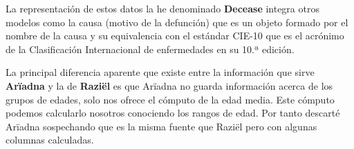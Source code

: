 La representación de estos datos la he denominado \textbf{Decease} integra otros modelos como
la causa (motivo de la defunción) que es un objeto formado por el nombre de la causa y su
equivalencia con el estándar \gls{CIE-10} que es el acrónimo de la Clasificación
Internacional de enfermedades en su 10.ª edición.

La principal diferencia aparente que existe entre la información que sirve
\textbf{Arïadna} y la de \textbf{Raziël} es que Arïadna no guarda información acerca de los
grupos de edades, solo nos ofrece el cómputo de la edad media. Este cómputo podemos
calcularlo nosotros conociendo los rangos de edad. Por tanto descarté Arïadna sospechando
que es la misma fuente que Raziël pero con algunas columnas calculadas.